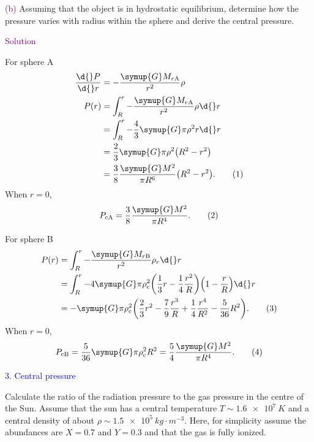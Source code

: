 \documentclass[UTF8, 12pt, a4paper, oneside, twocolumn, fontset=none]{ctexart}
\begin{document}
\hspace*{\fill}

\noindent\textcolor{purple}{(b)} Assuming that the object is in hydrostatic equilibrium, determine how the pressure varies with radius within the sphere and derive the central pressure.

\hspace*{\fill}

\noindent\textcolor{purple}{Solution}

For sphere A
\begin{align}
\frac{\d{}P}{\d{}r}&=-\frac{\symup{G}M_{r\text{A}}}{r^{2}}\rho\notag\\
P\mleft(r\mright)&=\int_{R}^{r}-\frac{\symup{G}M_{r\text{A}}}{r^{2}}\rho\d{}r\notag\\
&=\int_{R}^{r}-\frac{4}{3}\symup{G}\pi\rho^{2}r\d{}r\notag\\
&=\frac{2}{3}\symup{G}\pi\rho^{2}\mleft(R^{2}-r^{2}\mright)\notag\\
&=\frac{3}{8}\frac{\symup{G}M^{2}}{\pi{}R^{6}}\mleft(R^{2}-r^{2}\mright).\tag{1}
\end{align}
When $r=0$,
\begin{equation}
P_{\mathrm{c}\text{A}}=\frac{3}{8}\frac{\symup{G}M^{2}}{\pi{}R^{4}}.\tag{2}
\end{equation}

For sphere B
\begin{align}
P\mleft(r\mright)&=\int_{R}^{r}-\frac{\symup{G}M_{r\text{B}}}{r^{2}}\rho_{r}\d{}r\notag\\
&=\int_{R}^{r}-4\symup{G}\pi\rho_{\mathrm{c}}^{2}\mleft(\frac{1}{3}r-\frac{1}{4}\frac{r^{2}}{R}\mright)\mleft(1-\frac{r}{R}\mright)\d{}r\notag\\
&=-\symup{G}\pi\rho_{\mathrm{c}}^{2}\mleft(\frac{2}{3}r^{2}-\frac{7}{9}\frac{r^{3}}{R}+\frac{1}{4}\frac{r^{4}}{R^{2}}-\frac{5}{36}R^{2}\mright).\tag{3}
\end{align}
When $r=0$,
\begin{equation}
P_{\mathrm{c}\text{B}}=\frac{5}{36}\symup{G}\pi\rho_{\mathrm{c}}^{2}R^{2}=\frac{5}{4}\frac{\symup{G}M^{2}}{\pi{}R^{4}}.\tag{4}
\end{equation}

\hspace*{\fill}

\noindent\textcolor{blue}{3. Central pressure}

\noindent Calculate the ratio of the radiation pressure to the gas pressure in the centre of the Sun. Assume that the sun has a central temperature $T\sim\qty{1.6e7}{K}$ and a central density of about $\rho\sim\qty{1.5e5}{kg\cdot{}m^{-3}}$. Here, for simplicity assume the abundances are $X=0.7$ and $Y=0.3$ and that the gas is fully ionized.
\end{document}
